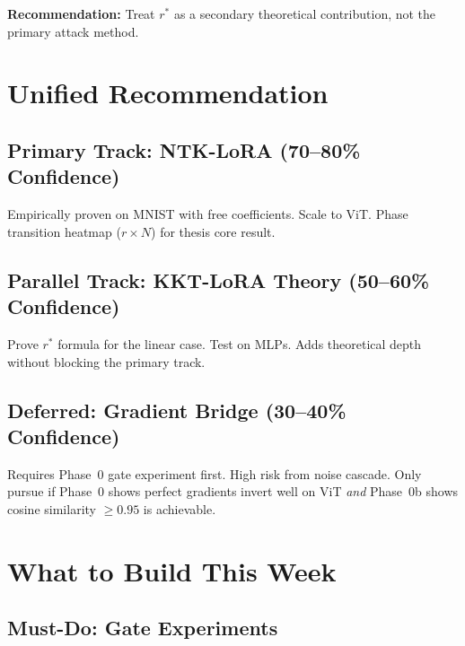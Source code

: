 \documentclass[11pt,a4paper]{article}
\begin{document}
\textbf{Recommendation:} Treat $r^*$ as a secondary theoretical contribution, not the primary attack method.


\section{Unified Recommendation}

\subsection{Primary Track: NTK-LoRA (70--80\% Confidence)}

Empirically proven on MNIST with free coefficients.
Scale to ViT.
Phase transition heatmap ($r \times N$) for thesis core result.

\subsection{Parallel Track: KKT-LoRA Theory (50--60\% Confidence)}

Prove $r^*$ formula for the linear case.
Test on MLPs.
Adds theoretical depth without blocking the primary track.

\subsection{Deferred: Gradient Bridge (30--40\% Confidence)}

Requires Phase~0 gate experiment first. High risk from noise cascade. Only pursue if Phase~0 shows perfect gradients invert well on ViT \emph{and} Phase~0b shows cosine similarity $\geq 0.95$ is achievable.


\section{What to Build This Week}

\subsection{Must-Do: Gate Experiments}
\end{document}
